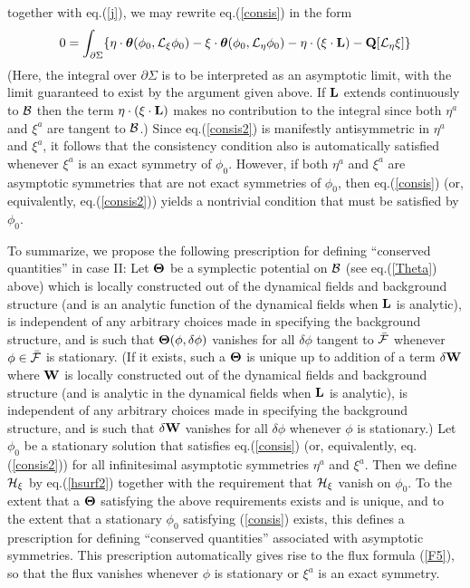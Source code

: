 together with eq.(\ref{j}), we may rewrite eq.(\ref{consis}) in the form
\begin{equation}
0 = \int_{\partial \Sigma} \{ \eta \cdot {\mbox{\boldmath
$\theta$}}(\phi_0,{\cal L}_\xi \phi_0) - \xi \cdot {\mbox{\boldmath
$\theta$}}(\phi_0,{\cal L}_\eta \phi_0) - \eta \cdot (\xi \cdot {\bf
L}) - {\bf Q}[{\cal L}_\eta \xi] \}
\label{consis2}
\end{equation}
(Here, the integral over $\partial \Sigma$ is to be interpreted as an
asymptotic limit, with the limit guaranteed to exist by the argument
given above. If ${\bf L}$ extends continuously to ${\cal B}$ then the
term $\eta \cdot (\xi \cdot {\bf L})$ makes no contribution to the
integral since both $\eta^a$ and $\xi^a$ are tangent to $\cal B$.)
Since eq.(\ref{consis2}) is manifestly antisymmetric in $\eta^a$ and
$\xi^a$, it follows that the consistency condition also is
automatically satisfied whenever $\xi^a$ is an exact symmetry of
$\phi_0$. However, if both $\eta^a$ and $\xi^a$ are asymptotic
symmetries that are not exact symmetries of $\phi_0$, then
eq.(\ref{consis}) (or, equivalently, eq.(\ref{consis2})) yields a
nontrivial condition that must be satisfied by $\phi_0$.

To summarize, we propose the following prescription for defining
``conserved quantities'' in case II: Let ${\mbox{\boldmath $\Theta$}}$
be a symplectic potential on ${\cal B}$ (see eq.(\ref{Theta}) above)
which is locally constructed out of the dynamical fields and
background structure (and is an analytic function of the dynamical
fields when $\bf L$ is analytic), is independent of any arbitrary
choices made in specifying the background structure, and is such that
${\mbox{\boldmath $\Theta$}}(\phi, \delta \phi)$ vanishes for all
$\delta \phi$ tangent to $\bar{\cal F}$ whenever $\phi \in \bar{\cal
F}$ is stationary. (If it exists, such a ${\mbox{\boldmath $\Theta$}}$
is unique up to addition of a term $\delta {\bf W}$ where ${\bf W}$ is
locally constructed out of the dynamical fields and background
structure (and is analytic in the dynamical fields when $\bf L$ is
analytic), is independent of any arbitrary choices made in specifying
the background structure, and is such that $\delta {\bf W}$ vanishes
for all $\delta \phi$ whenever $\phi$ is stationary.) Let $\phi_0$ be
a stationary solution that satisfies eq.(\ref{consis}) (or,
equivalently, eq.(\ref{consis2})) for all infinitesimal asymptotic
symmetries $\eta^a$ and $\xi^a$. Then we define ${\cal H}_\xi$ by
eq.(\ref{hsurf2}) together with the requirement that ${\cal H}_\xi$
vanish on $\phi_0$. To the extent that a ${\mbox{\boldmath $\Theta$}}$
satisfying the above requirements exists and is unique, and to the
extent that a stationary $\phi_0$ satisfying (\ref{consis}) exists,
this defines a prescription for defining ``conserved quantities''
associated with asymptotic symmetries. This prescription automatically
gives rise to the flux formula (\ref{F5}), so that the flux vanishes
whenever $\phi$ is stationary or $\xi^a$ is an exact symmetry.

